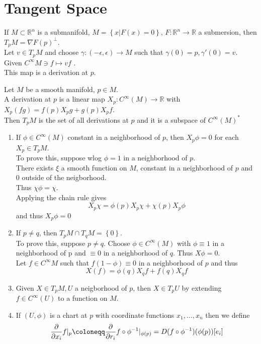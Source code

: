 \documentclass[../main.tex]{subfiles}
\begin{document}
\section{Tangent Space}
If $M \subset \mathbb{R}^n$ is a submanifold, $M = \left\{ x| F( x) =0 \right\} $, $F: \mathbb{R}^n\to \mathbb{R}$ a submersion, then $T_pM = \nabla F( p) ^{\perp}$.\\
Let $v\in T_pM$ and choose $\gamma:( -\epsilon,\epsilon) \to M$ such that $\gamma( 0) =p,\gamma'( 0) =v$.\\
Given $C^{ \infty }M\ni f \mapsto vf$ .\\
This map is a derivation at $p$.
\begin{defn}
	Let $M$ be a smooth manifold, $p \in M$.\\
	A derivation at $p$ is a linear map $X_p:C^{ \infty }( M) \to \mathbb{R}$ with $X_p( fg) = f( p) X_pg + g( p) X_pf$.\\
	Then $T_pM$ is the set of all derivations at $p$ and it is a subspace of $C^{ \infty }( M) ^{\ast}$ 
\end{defn}	
\begin{rmq}
\begin{enumerate}
\item If $\phi \in C^{ \infty }( M) $ constant in a neighborhood of $p$, then $X_p\phi = 0$ for each $X_p \in T_p M$.\\
	To prove this, suppose wlog $\phi =1 $ in a neighborhood of $p$.\\
	There exists $\xi$ a smooth function on $M$, constant in a neighborhood of $p$ and $0$ outside of the neigborhood.\\
	Thus $\chi\phi = \chi$.\\
	Applying the chain rule gives
	\[ 
	X_p \chi = \phi( p) X_p\chi + \chi( p ) X_p\phi
	\]
	and thus $X_p\phi =0$ 
\item If $p\neq q$, then $T_pM \cap T_qM = \left\{ 0 \right\} $.\\
	To prove this, suppose $p \neq q$. Choose $\phi \in C^{ \infty }( M) $ with $\phi\equiv 1$ in a neighborhood of p and $\equiv 0$ in a neighborhood of $q$. Thus $X\phi =0$.\\
	Let $f\in C^{ \infty }M$ such that $f( 1- \phi)\equiv 0 $ in a neighborhood of $p$ and thus 
	\[ 
	X( f) = \phi( q) X_q f + f( q) X_q f
	\]
	
\item Given $X\in T_pM, U$ a neigborhood of $p$, then $X\in T_pU$ by extending $f\in C^{ \infty }( U) $ to a function on $M$.
\item If $( U,\phi) $ is a chart at $p$ with coordinate functions $x_1,\ldots,x_n$ then we define
	\[ 
\frac{\del}{\del x_i} f|_p \coloneqq \frac{\del}{\del r_i} f\circ\phi^{-1}|_{\phi( p) } = D( f\circ\phi^{-1}) ( \phi( p) ) [ e_i] 	
	\]

\end{enumerate}
\end{rmq}
\end{document}
